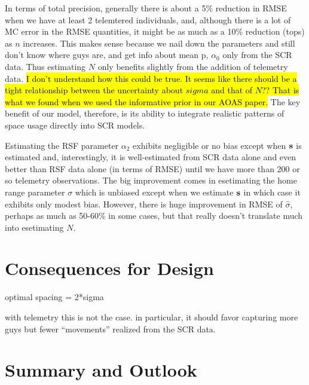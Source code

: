 In terms of total precision, generally there is about a 5\% reduction
in RMSE when we have at least 2 telemtered individuals, and, although
there is a lot of MC error in the RMSE quantities, it might be as much
as a 10\% reduction (tops) as $n$ increases. This makes sense because
we nail down the parameters and still don't know where guys are, and
get info about mean p, $\alpha_{0}$ only from the SCR data. Thus
estimating $N$ only benefits slightly from the addition of telemetry
data.  \hl{I don't understand how this could be true. It seems like
  there should be a tight relationship between the uncertainty about
  $sigma$ and that of $N$?? That is what we found when we used the
  informative prior in our AOAS paper.} The key benefit of our model, therefore, is its ability to
integrate realistic patterns of space usage directly into SCR models.

Estimating the RSF parameter $\alpha_{2}$ exhibits negligible or no
bias except when ${\bf s}$ is estimated and, interestingly, it is
well-estimated from SCR data alone and even better than RSF data alone
(in terms of RMSE) until we have more than 200 or so telemetry
observations.  The big improvement comes in esetimating the home range
parameter $\sigma$ which is unbiased except when we estimate ${\bf s}$
in which case it exhibits only modest bias.  However, there is huge
improvement in RMSE of $\hat{\sigma}$, perhaps as much as 50-60\% in
some cases, but that really doesn't translate much into esetimating
$N$.


\section{Consequences for Design}

optimal spacing = 2*sigma
\citep{efford:inprep}

with telemetry this is not the case. in particular, it should favor
capturing more guys but fewer ``movements'' realized from the SCR
data. 



\section{Summary and Outlook}


